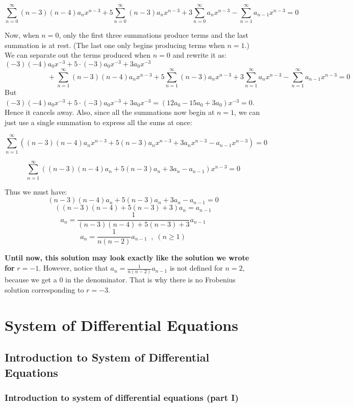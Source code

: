 \documentclass[12pt]{report}
\begin{document}
$$  \sum_{n=0}^{\infty} (n-3)(n-4) a_n x^{n-3} + 5 \sum_{n=0}^{\infty} (n-3) a_n x^{n-3} + 3 \sum_{n=0}^{\infty} a_n x^{n-3} - \sum_{n=1}^{\infty} a_{n-1} x^{n-3} = 0$$

Now, when $n=0$, only the first three summations produce terms and the last summation is at rest. (The last one only begins producing terms when $n=1$.) We can separate out the terms produced when $n=0$ and rewrite it as:
$$ (-3)(-4)a_0 x^{-3} + 5\cdot (-3)a_0 x^{-3} + 3a_0 x^{-3}\qquad \qquad \qquad \qquad \qquad \qquad \qquad \qquad \qquad \qquad$$
$$ \qquad \qquad \qquad + \sum_{n=1}^{\infty} (n-3)(n-4) a_n x^{n-3} + 5 \sum_{n=1}^{\infty} (n-3) a_n x^{n-3} + 3 \sum_{n=1}^{\infty} a_n x^{n-3} - \sum_{n=1}^{\infty} a_{n-1} x^{n-3} = 0 $$
But $ (-3)(-4)a_0 x^{-3} + 5\cdot (-3)a_0 x^{-3} + 3a_0 x^{-3} = (12a_0 -15a_0 + 3a_0)x^{-3} =0$. Hence it cancels away. Also, since all the summations now begin at $n=1$, we can just use a single summation to express all the sums at once:

$$\sum_{n=1}^{\infty} \left( (n-3)(n-4) a_n x^{n-3} + 5 (n-3) a_n x^{n-3} + 3 a_n x^{n-3} - a_{n-1} x^{n-3} \right)= 0$$

$$\sum_{n=1}^{\infty} \left( (n-3)(n-4) a_n + 5 (n-3) a_n + 3 a_n - a_{n-1} \right)  x^{n-3}= 0$$

Thus we must have:
$$ (n-3)(n-4) a_n + 5 (n-3) a_n + 3 a_n  -a_{n-1} = 0$$
$$ \left( (n-3)(n-4) + 5 (n-3) + 3 \right) a_n = a_{n-1}$$
$$ a_n = \frac{1}{(n-3)(n-4) + 5 (n-3) + 3} a_{n-1} $$
$$ a_n = \frac{1}{n(n-2)} a_{n-1} \; \; , \; (n\geq 1)$$

\textbf{Until now, this solution may look exactly like the solution we wrote for } $r=-1$. However, notice that $ a_n = \frac{1}{n(n-2)} a_{n-1}$ is not defined for $n=2$, because we get a $0$ in the denominator. That is why there is no Frobenius solution corresponding to $r=-3$. 


\chapter{System of Differential Equations}
\section{Introduction to System of Differential Equations}

\subsection*{Introduction to system of differential equations (part I)}
\end{document}
